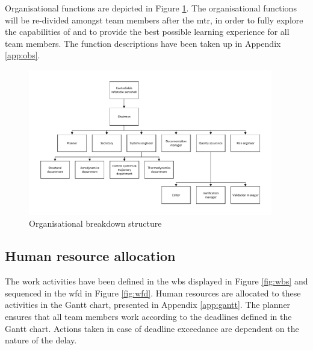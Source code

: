 Organisational functions are depicted in Figure  \ref{fig:obs}. The organisational functions will be re-divided amongst team members after the \gls{mtr}, in order to fully explore the capabilities of and to provide the best possible learning experience for all team members. The function descriptions have been taken up in Appendix \ref{app:obs}.

\begin{figure}[H]
\centering
\includegraphics[width=0.95\textwidth]{./Figure/OBS_MTR.pdf}
\caption{Organisational breakdown structure} \label{fig:OBS}
\label{fig:obs}
\end{figure}

\subsection{Human resource allocation}
\label{sec:gantt}
The work activities have been defined in the \gls{wbs} displayed in Figure  \ref{fig:wbs} and sequenced in the \gls{wfd} in Figure  \ref{fig:wfd}. Human resources are allocated to these activities in the Gantt chart, presented in Appendix \ref{app:gantt}. The planner ensures that all team members work according to the deadlines defined in the Gantt chart. Actions taken in case of deadline exceedance are dependent on the nature of the delay.
